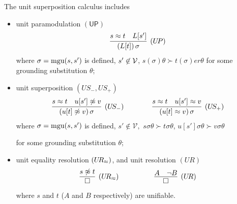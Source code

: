 
\begin{definition}\label{def:unit-superpositin-calculus}
	The {\myem unit superposition calculus} includes
	\begin{itemize}
		\item unit paramodulation $\mathsf{(UP)}$
		\begin{gather*}
		\infer
		[(U\!P)]
		{(L[t])\,\sigma}
		{s\mEQ t&L[s']}
		\end{gather*}
		where $\sigma=\operatorname{mgu}(s,s')$ is defined,
		$s'\not\in{\mathcal V}$,
		$s(\sigma)\theta\succ t(\sigma)er\theta$
		for some grounding substitution $\theta$;

		\item unit superposition $(U\!S_-,U\!S_+)$
		\begin{gather*}
		\infer
		[(U\!S_-)]
		{(u[t]\mNE v)\,\sigma}
		{s\mEQ t&u[s']\mNE v}
		\qquad\qquad
		\infer
		[(U\!S_+)]
		{(u[t]\mEQ v)\,\sigma}
		{s\mEQ t&u[s']\mEQ v}
		\end{gather*}
		where $\sigma=\operatorname{mgu}(s,s')$ is defined,
		$s'\not\in\mathcal{V},$
		$s\sigma\theta\succ t\sigma\theta$,
		$u[s']\sigma\theta\succ v\sigma\theta$

		for some grounding substitution $\theta$;
		\item unit equality resolution $(U\!R_\approx)$, and unit resolution $(U\!R)$
		\begin{gather*}
		\infer
		[(U\!R_\mEQ)]
		{\emptyclause}
		{s\mNE t}
		\quad\quad\quad\qquad
		\infer
		[(U\!R)]
		{\emptyclause}
		{A&\lnot B}
		\end{gather*}
		where $s$ and $t$ ($A$ and $B$ respectively) are unifiable.
	\end{itemize}
\end{definition}